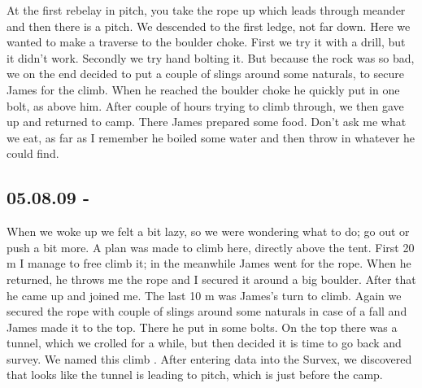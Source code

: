 At the first rebelay in  pitch, you take the rope up
which leads through meander and then there is a pitch. We descended to
the first ledge, not far down. Here we wanted to make a traverse to the
boulder choke. First we try it with a drill, but it didn't work. Secondly
we try hand bolting it. But because the rock was so bad, we on the end
decided to put a couple of slings around some naturals, to secure James
for the climb. When he reached the boulder choke he quickly put in one
bolt, as  above him. After couple of hours
trying to climb through, we then gave up and returned to camp. There
James prepared some food. Don't ask me what we eat, as far as I remember
he boiled some water and then throw in whatever he could find.



\subsection{05.08.09 - \protect{}}


When we woke up we felt a bit lazy, so we were wondering what to do; go
out or push a bit more. A plan was made to climb here, directly above
the tent. First 20 m I manage to free climb it; in the meanwhile James
went for the rope. When he returned, he throws me the rope and I secured
it around a big boulder. After that he came up and joined me. The last
10 m was James's turn to climb. Again we secured the rope with couple of
slings around some naturals in case of a fall and James made it to the
top. There he put in some bolts. On the top there was a tunnel, which we
crolled for a while, but then decided it is time to go back and survey.
We named this climb . After entering data into the
Survex, we discovered that looks like the tunnel is leading to  pitch, which is just before the camp.




